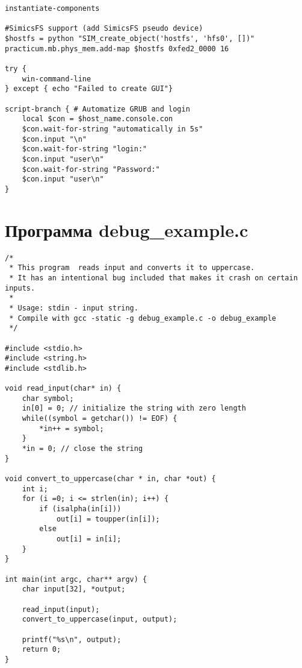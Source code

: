 \begin{lstlisting}
instantiate-components

#SimicsFS support (add SimicsFS pseudo device)
$hostfs = python "SIM_create_object('hostfs', 'hfs0', [])"
practicum.mb.phys_mem.add-map $hostfs 0xfed2_0000 16

try {
    win-command-line
} except { echo "Failed to create GUI"}

script-branch { # Automatize GRUB and login
    local $con = $host_name.console.con
    $con.wait-for-string "automatically in 5s"
    $con.input "\n"
    $con.wait-for-string "login:"
    $con.input "user\n"
    $con.wait-for-string "Password:"
    $con.input "user\n"
}

\end{lstlisting}

\chapter{Программа debug_example.c}\label{chap:debug-example}

\begin{lstlisting}
/*
 * This program  reads input and converts it to uppercase.
 * It has an intentional bug included that makes it crash on certain inputs.
 * 
 * Usage: stdin - input string.
 * Compile with gcc -static -g debug_example.c -o debug_example
 */
	
#include <stdio.h>
#include <string.h>
#include <stdlib.h>

void read_input(char* in) {
    char symbol;
    in[0] = 0; // initialize the string with zero length
    while((symbol = getchar()) != EOF) {
        *in++ = symbol;
    }
    *in = 0; // close the string
}

void convert_to_uppercase(char * in, char *out) {
    int i;
    for (i =0; i <= strlen(in); i++) {
        if (isalpha(in[i]))
            out[i] = toupper(in[i]);
        else
            out[i] = in[i];
    }
}

int main(int argc, char** argv) {
    char input[32], *output;
    
    read_input(input);
    convert_to_uppercase(input, output);
    
    printf("%s\n", output);
    return 0;
}
\end{lstlisting}